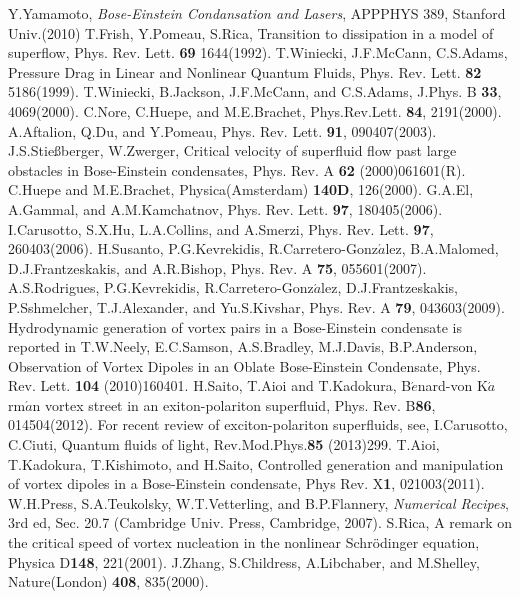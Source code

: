 \documentclass[12pt,a4paper]{report}
\begin{document}
\begin{thebibliography}{81}
 Y.Yamamoto, {\it Bose-Einstein Condansation and Lasers}, APPPHYS 389, Stanford Univ.(2010)
 T.Frish, Y.Pomeau, S.Rica, Transition to dissipation in a model of superflow, Phys. Rev. Lett. {\bf 69} 1644(1992).
 T.Winiecki, J.F.McCann, C.S.Adams, Pressure Drag in Linear and Nonlinear Quantum Fluids, Phys. Rev. Lett. {\bf 82} 5186(1999).
 T.Winiecki, B.Jackson, J.F.McCann, and C.S.Adams, J.Phys. B {\bf 33}, 4069(2000).
 C.Nore, C.Huepe, and M.E.Brachet, Phys.Rev.Lett. {\bf 84}, 2191(2000).
 A.Aftalion, Q.Du, and Y.Pomeau, Phys. Rev. Lett. {\bf 91}, 090407(2003).
 J.S.Stie\ss berger, W.Zwerger, Critical velocity of superfluid flow past large obstacles in Bose-Einstein condensates, Phys. Rev. A {\bf 62} (2000)061601(R).
 C.Huepe and M.E.Brachet, Physica(Amsterdam) {\bf 140D}, 126(2000).
 G.A.El, A.Gammal, and A.M.Kamchatnov, Phys. Rev. Lett. {\bf 97}, 180405(2006).
 I.Carusotto, S.X.Hu, L.A.Collins, and A.Smerzi, Phys. Rev. Lett. {\bf 97}, 260403(2006).
 H.Susanto, P.G.Kevrekidis, R.Carretero-Gonz$\acute{a}$lez, B.A.Malomed, D.J.Frantzeskakis, and A.R.Bishop, Phys. Rev. A {\bf 75}, 055601(2007).
 A.S.Rodrigues, P.G.Kevrekidis, R.Carretero-Gonz$\acute{a}$lez, D.J.Frantzeskakis, P.Sshmelcher, T.J.Alexander, and Yu.S.Kivshar, Phys. Rev. A {\bf 79}, 043603(2009).
 Hydrodynamic generation of vortex pairs in a Bose-Einstein condensate is reported in T.W.Neely, E.C.Samson, A.S.Bradley, M.J.Davis, B.P.Anderson, Observation of Vortex Dipoles in an Oblate Bose-Einstein Condensate, Phys. Rev. Lett. {\bf 104} (2010)160401.
 H.Saito, T.Aioi and T.Kadokura, B$\acute{e}$nard-von K$\acute{a}$rm$\acute{a}$n vortex street in an exiton-polariton superfluid, Phys. Rev. B{\bf 86}, 014504(2012).
 For recent review of exciton-polariton superfluids, see, I.Carusotto, C.Ciuti, Quantum fluids of light, Rev.Mod.Phys.{\bf 85} (2013)299.
 T.Aioi, T.Kadokura, T.Kishimoto, and H.Saito, Controlled generation and manipulation of vortex dipoles in a Bose-Einstein condensate, Phys Rev. X{\bf 1}, 021003(2011).
 W.H.Press, S.A.Teukolsky, W.T.Vetterling, and B.P.Flannery, {\it Numerical Recipes}, 3rd ed, Sec. 20.7 (Cambridge Univ. Press, Cambridge, 2007).
 S.Rica, A remark on the critical speed of vortex nucleation in the nonlinear Schr\"{o}dinger equation, Physica D{\bf 148}, 221(2001).
 J.Zhang, S.Childress, A.Libchaber, and M.Shelley, Nature(London) {\bf 408}, 835(2000).

\end{thebibliography}
\end{document}
